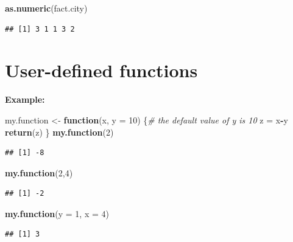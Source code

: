\documentclass[]{book}
\newenvironment{Shaded}{\begin{snugshade}}{\end{snugshade}}
\newcommand{\CommentTok}[1]{\textcolor[rgb]{0.56,0.35,0.01}{\textit{#1}}}
\newcommand{\ControlFlowTok}[1]{\textcolor[rgb]{0.13,0.29,0.53}{\textbf{#1}}}
\newcommand{\DataTypeTok}[1]{\textcolor[rgb]{0.13,0.29,0.53}{#1}}
\newcommand{\DecValTok}[1]{\textcolor[rgb]{0.00,0.00,0.81}{#1}}
\newcommand{\KeywordTok}[1]{\textcolor[rgb]{0.13,0.29,0.53}{\textbf{#1}}}
\newcommand{\NormalTok}[1]{#1}
\newcommand{\OperatorTok}[1]{\textcolor[rgb]{0.81,0.36,0.00}{\textbf{#1}}}
\newcommand{\StringTok}[1]{\textcolor[rgb]{0.31,0.60,0.02}{#1}}
\begin{document}
\begin{Shaded}
\begin{Highlighting}[]
\KeywordTok{as.numeric}\NormalTok{(fact.city)}
\end{Highlighting}
\end{Shaded}

\begin{verbatim}
## [1] 3 1 1 3 2
\end{verbatim}

\hypertarget{user-defined-functions}{%
\section{User-defined functions}\label{user-defined-functions}}

\textbf{Example:}

\begin{Shaded}
\begin{Highlighting}[]
\NormalTok{my.function <-}\StringTok{ }\ControlFlowTok{function}\NormalTok{(x, }\DataTypeTok{y =} \DecValTok{10}\NormalTok{) \{}\CommentTok{# the default value of y is 10}
\NormalTok{  z =}\StringTok{ }\NormalTok{x}\OperatorTok{-}\NormalTok{y}
  \KeywordTok{return}\NormalTok{(z)}
\NormalTok{\}}
\KeywordTok{my.function}\NormalTok{(}\DecValTok{2}\NormalTok{)}
\end{Highlighting}
\end{Shaded}

\begin{verbatim}
## [1] -8
\end{verbatim}

\begin{Shaded}
\begin{Highlighting}[]
\KeywordTok{my.function}\NormalTok{(}\DecValTok{2}\NormalTok{,}\DecValTok{4}\NormalTok{)}
\end{Highlighting}
\end{Shaded}

\begin{verbatim}
## [1] -2
\end{verbatim}

\begin{Shaded}
\begin{Highlighting}[]
\KeywordTok{my.function}\NormalTok{(}\DataTypeTok{y =} \DecValTok{1}\NormalTok{, }\DataTypeTok{x =} \DecValTok{4}\NormalTok{)}
\end{Highlighting}
\end{Shaded}

\begin{verbatim}
## [1] 3
\end{verbatim}
\end{document}
